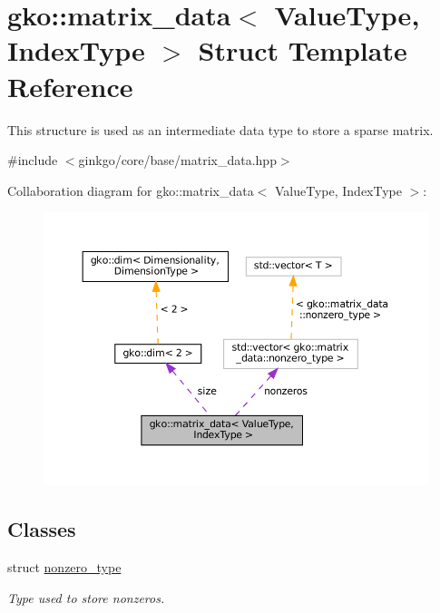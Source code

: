 \hypertarget{structgko_1_1matrix__data}{}\section{gko\+:\+:matrix\+\_\+data$<$ Value\+Type, Index\+Type $>$ Struct Template Reference}
\label{structgko_1_1matrix__data}


This structure is used as an intermediate data type to store a sparse matrix.  




{\ttfamily \#include $<$ginkgo/core/base/matrix\+\_\+data.\+hpp$>$}



Collaboration diagram for gko\+:\+:matrix\+\_\+data$<$ Value\+Type, Index\+Type $>$\+:
\nopagebreak
\begin{figure}[H]
\begin{center}
\leavevmode
\includegraphics[width=350pt]{structgko_1_1matrix__data__coll__graph}
\end{center}
\end{figure}
\subsection*{Classes}
\begin{DoxyCompactItemize}
\item 
struct \hyperlink{structgko_1_1matrix__data_1_1nonzero__type}{nonzero\+\_\+type}
\begin{DoxyCompactList}\small\item\em Type used to store nonzeros. \end{DoxyCompactList}\end{DoxyCompactItemize}
